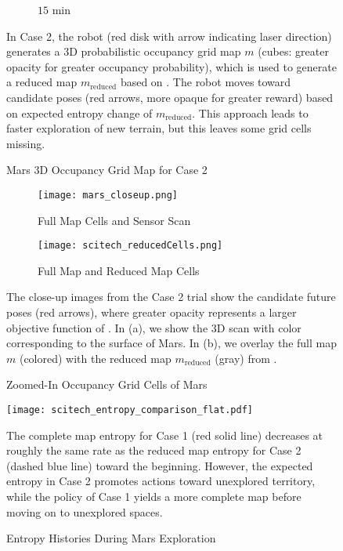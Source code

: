\begin{figure}[!t]
\begin{subfigure}[t]{0.49\columnwidth}
        		\caption{$15$ min}
		\vspace*{0.025\textwidth}
    	\end{subfigure}
\caption{Mars 3D Occupancy Grid Map for Case 2}
	\medskip
	\small
	In Case 2, the robot (red disk with arrow indicating laser direction) generates a 3D probabilistic occupancy grid map $m$ (cubes: greater opacity for greater occupancy probability), which is used to generate a reduced map $m_\text{reduced}$ based on . The robot moves toward candidate poses (red arrows, more opaque for greater reward) based on expected entropy change of $m_\text{reduced}$. This approach leads to faster exploration of new terrain, but this leaves some grid cells missing.
\label{fig:mars3DogmCase2}
\end{figure}

\begin{figure}[!t]
	\centering
	\begin{subfigure}[t]{0.95\columnwidth}
           	\centering
          	\texttt{[image: mars\_closeup.png]}
        		\caption{Full Map Cells and Sensor Scan}
		\vspace*{0.025\textwidth}
    	\end{subfigure}
	\centering
	\begin{subfigure}[t]{0.95\columnwidth}
           	\centering
          	\texttt{[image: scitech\_reducedCells.png]}
        		\caption{Full Map and Reduced Map Cells}
		\vspace*{0.025\textwidth}
    	\end{subfigure}
	\caption{Zoomed-In Occupancy Grid Cells of Mars}
	\medskip
	\small
	The close-up images from the Case 2 trial show the candidate future poses (red arrows), where greater opacity represents a larger objective function of . In (a), we show the 3D scan with color corresponding to the surface of Mars. In (b), we overlay the full map $m$ (colored) with the reduced map $m_\text{reduced}$ (gray) from .
	\label{fig:marsZoomedIn}
\end{figure}


\begin{figure}
	\centerline{
		\texttt{[image: scitech\_entropy\_comparison\_flat.pdf]}
	}
	\caption{Entropy Histories During Mars Exploration}
	\medskip
	\small
	The complete map entropy for Case 1 (red solid line) decreases at roughly the same rate as the reduced map entropy for Case 2 (dashed blue line) toward the beginning. However, the expected entropy in Case 2 promotes actions toward unexplored territory, while the policy of Case 1 yields a more complete map before moving on to unexplored spaces.
	\label{fig:mars3Dentropy}
\end{figure}


